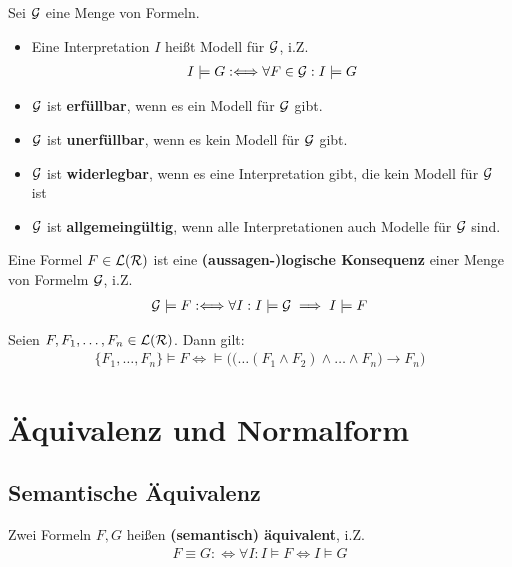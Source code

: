 \begin{definition}\label{def3.15}
	Sei $\mathcal{G}$ eine Menge von Formeln.
	\begin{itemize}
		\item Eine Interpretation $I$ heißt Modell für $\mathcal{G}$, i.Z.
		\begin{align*}
			I\models G:\Longleftrightarrow\forall F\in\mathcal{G}:I\models G
		\end{align*}
		\item $\mathcal{G}$ ist \textbf{erfüllbar}, wenn es ein Modell für $\mathcal{G}$ gibt.
		\item $\mathcal{G}$ ist \textbf{unerfüllbar}, wenn es kein Modell für $\mathcal{G}$ gibt.
		\item $\mathcal{G}$ ist \textbf{widerlegbar}, wenn es eine Interpretation gibt, die kein Modell für $\mathcal{G}$ ist
		\item $\mathcal{G}$ ist \textbf{allgemeingültig}, wenn alle Interpretationen auch Modelle für $\mathcal{G}$ sind.
	\end{itemize}
\end{definition}

\begin{definition}\label{def3.16}
	Eine Formel $F\in\mathcal{L}(\mathcal{R})$ ist eine \textbf{(aussagen-)logische Konsequenz} einer Menge von Formelm $\mathcal{G}$, i.Z.
	\begin{align*}
		\mathcal{G}\models F:\Longleftrightarrow\forall I:I\models\mathcal{G}\implies I\models F
	\end{align*}
\end{definition}

\begin{satz}\label{satz3.17}
	Seien $F,F_1,\ldots,F_n\in\mathcal{L}(\mathcal{R})$. Dann gilt:
	\begin{align*}
		\big\lbrace F_1,\ldots,F_n\big\rbrace\models F\Longleftrightarrow\models\Big(\big(\ldots(F_1\wedge F_2)\wedge\ldots\wedge F_n\big)\to F_n\Big)
	\end{align*}
\end{satz}

\section{Äquivalenz und Normalform}
\subsection{Semantische Äquivalenz}

\begin{definition}\label{def3.18}
	Zwei Formeln $F,G$ heißen \textbf{(semantisch) äquivalent}, i.Z.
	\begin{align*}
		F\equiv G:\Longleftrightarrow\forall I:I\models F\Longleftrightarrow I\models G
	\end{align*}
\end{definition}

